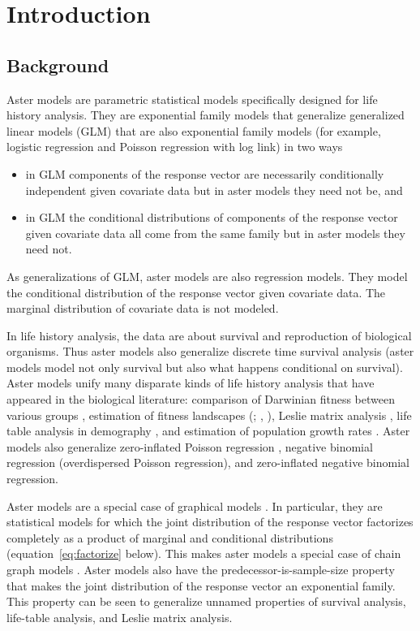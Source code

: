 
\chapter{Introduction}
\label{ch:introduction}

\section{Background}

Aster models \citep*{aster1,aster2,reaster} are parametric statistical models
specifically designed for life history analysis.  They are exponential family
models that generalize generalized linear models (GLM) that are also
exponential family models (for example, logistic regression and
Poisson regression with log link) in two ways
\begin{itemize}
\item in GLM components of the response vector are
    necessarily conditionally independent given covariate data
    but in aster models they need not be, and
\item in GLM the conditional distributions of components of the
    response vector given covariate data all come from the same family
    but in aster models they need not.
\end{itemize}
As generalizations of GLM, aster models are also regression models.
They model the conditional distribution of the response vector given
covariate data.  The marginal distribution of covariate data is not
modeled.

In life history analysis, the data are about survival and reproduction
of biological organisms.  Thus aster models also generalize discrete time
survival analysis (aster models model not only survival but also
what happens conditional on survival).
Aster models unify many disparate kinds of life history analysis that have
appeared in the biological literature: comparison of Darwinian fitness between
various groups \citep{aster1,aster2}, estimation of fitness landscapes
(\citealp{lande-arnold}; \citealp{aster2,aster3}, \citealp*{aster-hornworm}),
Leslie matrix analysis
\citep{caswell}, life table analysis in demography \citep{goodman},
and estimation of population growth rates
\citep{fisher,lenski-service,aster2,aster-hornworm}.
Aster models also generalize zero-inflated Poisson regression \citep{lambert},
negative binomial regression (overdispersed Poisson regression),
and zero-inflated negative binomial regression.

Aster models are a special case of graphical models \citep{lauritzen}.
In particular, they are statistical models for which the joint distribution
of the response vector factorizes completely as a product of marginal and
conditional distributions (equation~\eqref{eq:factorize} below).
This makes aster models a special case of chain graph models
\citep[Sections~2.1.1 and~3.2.3]{lauritzen}.
Aster models also have the predecessor-is-sample-size property
that makes the joint distribution of the response vector an exponential
family.  This property can be seen to generalize unnamed properties
of survival analysis, life-table analysis, and Leslie matrix analysis.

